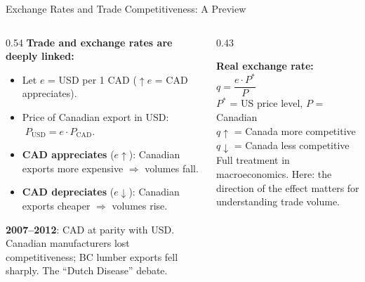 \documentclass[aspectratio=169]{beamer}
\begin{document}
\begin{frame}{Exchange Rates and Trade Competitiveness: A Preview}
\begin{columns}[T]
\begin{column}{0.54\textwidth}
\textbf{Trade and exchange rates are deeply linked:}
\begin{itemize}\small
  \item Let $e$ = USD per 1 CAD ($\uparrow e$ = CAD appreciates).
  \item Price of Canadian export in USD: $\;P_{\text{USD}} = e \cdot P_{\text{CAD}}$.
  \item \textbf{CAD appreciates} ($e\uparrow$): Canadian exports more expensive $\Rightarrow$ volumes fall.
  \item \textbf{CAD depreciates} ($e\downarrow$): Canadian exports cheaper $\Rightarrow$ volumes rise.
\end{itemize}
\vspace{0.2em}
\textbf{2007--2012}: CAD at parity with USD. Canadian manufacturers lost competitiveness; BC lumber exports fell sharply. The ``Dutch Disease'' debate.
\end{column}
\begin{column}{0.43\textwidth}
\begin{varbox}
\footnotesize\textbf{Real exchange rate:}\\[0.2em]
$q = \dfrac{e \cdot P^*}{P}$\\[0.2em]
$P^*$ = US price level, $P$ = Canadian\\[0.2em]
$q \uparrow$ = Canada more competitive\\
$q \downarrow$ = Canada less competitive\\[0.3em]
Full treatment in macroeconomics. Here: the direction of the effect matters for understanding trade volume.
\end{varbox}
\end{column}
\end{columns}
\end{frame}
\end{document}

